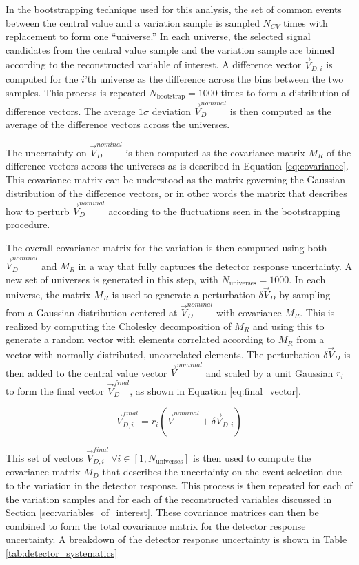 In the bootstrapping technique used for this analysis, the set of common events between the central value and a variation sample is sampled $N_{CV}$ times with replacement to form one ``universe.'' In each universe, the selected signal candidates from the central value sample and the variation sample are binned according to the reconstructed variable of interest. A difference vector $\vec{V}_{D,i}$ is computed for the $i$'th universe as the difference across the bins between the two samples. This process is repeated $N_{\text{bootstrap}} = 1000$ times to form a distribution of difference vectors. The average $1\sigma$ deviation $\vec{V}^{nominal}_D$ is then computed as the average of the difference vectors across the universes.

The uncertainty on $\vec{V}^{nominal}_D$ is then computed as the covariance matrix $M_R$ of the difference vectors across the universes as is described in Equation \ref{eq:covariance}. This covariance matrix can be understood as the matrix governing the Gaussian distribution of the difference vectors, or in other words the matrix that describes how to perturb $\vec{V}^{nominal}_D$ according to the fluctuations seen in the bootstrapping procedure.

The overall covariance matrix for the variation is then computed using both $\vec{V}^{nominal}_D$ and $M_R$ in a way that fully captures the detector response uncertainty. A new set of universes is generated in this step, with $N_{\text{universes}} = 1000$. In each universe, the matrix $M_R$ is used to generate a perturbation $\delta \vec{V}_D$ by sampling from a Gaussian distribution centered at $\vec{V}^{nominal}_D$ with covariance $M_R$. This is realized by computing the Cholesky decomposition of $M_R$ and using this to generate a random vector with elements correlated according to $M_R$ from a vector with normally distributed, uncorrelated elements. The perturbation $\delta \vec{V}_D$ is then added to the central value vector $\vec{V}^{nominal}$ and scaled by a unit Gaussian $r_i$ to form the final vector $\vec{V}^{final}_D$, as shown in Equation \ref{eq:final_vector}.

\begin{equation}
    \label{eq:final_vector}
    \vec{V}^{final}_{D,i} = r_i \left(\vec{V}^{nominal} + \delta \vec{V}_{D,i}\right)
\end{equation}

\noindent
This set of vectors $\vec{V}^{final}_{D,i}\ \forall i \in [1, N_{\text{universes}}]$ is then used to compute the covariance matrix $M_D$ that describes the uncertainty on the event selection due to the variation in the detector response. This process is then repeated for each of the variation samples and for each of the reconstructed variables discussed in Section \ref{sec:variables_of_interest}. These covariance matrices can then be combined to form the total covariance matrix for the detector response uncertainty. A breakdown of the detector response uncertainty is shown in Table \ref{tab:detector_systematics}

